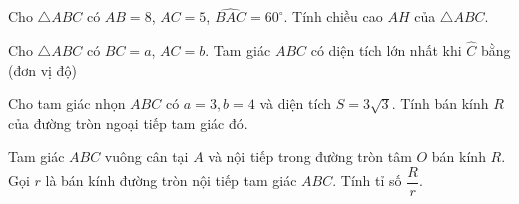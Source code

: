 \begin{ex}%
	Cho $\triangle ABC$ có $AB=8$, $AC=5$, $\widehat{BAC}=60^\circ$. Tính chiều cao $ AH$ của $\triangle ABC$.
\end{ex}

\begin{ex}%
	Cho $\triangle ABC$ có $ BC=a$, $AC=b$. Tam giác $ABC$ có diện tích lớn nhất khi $\widehat C$ bằng (đơn vị độ)
\end{ex}

\begin{ex}%
	Cho tam giác nhọn $ ABC$ có $ a=3,b=4$ và diện tích $ S=3\sqrt 3 $. Tính bán kính $ R$ của đường tròn ngoại tiếp tam giác đó.
\end{ex}

\begin{ex}%
	Tam giác $ ABC$ vuông cân tại $ A$ và nội tiếp trong đường tròn tâm $ O$ bán kính $ R$. Gọi $ r$ là bán kính đường tròn nội tiếp tam giác $ ABC$. Tính tỉ số $\dfrac{R}{r}$.
\end{ex}





